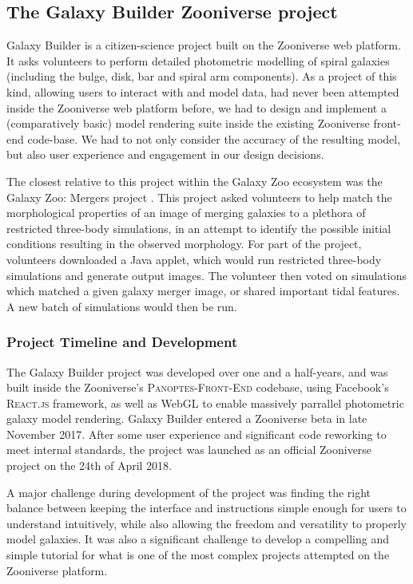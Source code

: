 \documentclass[../main.tex]{subfiles}
\begin{document}
\subsection{The Galaxy Builder Zooniverse project}

Galaxy Builder is a citizen-science project built on the Zooniverse web platform. It asks volunteers to perform detailed photometric modelling of spiral galaxies (including the bulge, disk, bar and spiral arm components). As a project of this kind, allowing users to interact with and model data, had never been attempted inside the Zooniverse web platform before, we had to design and implement a (comparatively basic) model rendering suite inside the existing Zooniverse front-end code-base. We had to not only consider the accuracy of the resulting model, but also user experience and engagement in our design decisions.

The closest relative to this project within the Galaxy Zoo ecosystem was the Galaxy Zoo: Mergers project \citep{Holincheck2016:1604.00435v1}. This project asked volunteers to help match the morphological properties of an image of merging galaxies to a plethora of restricted three-body simulations, in an attempt to identify the possible initial conditions resulting in the observed morphology. For part of the project, volunteers downloaded a Java applet, which would run restricted three-body simulations and generate output images. The volunteer then voted on simulations which matched a given galaxy merger image, or shared important tidal features. A new batch of simulations would then be run.

\subsubsection{Project Timeline and Development}

The Galaxy Builder project was developed over one and a half-years, and was built inside the Zooniverse's \textsc{Panoptes-Front-End} codebase, using Facebook's \textsc{React.js} framework, as well as WebGL to enable massively parrallel photometric galaxy model rendering. Galaxy Builder entered a Zooniverse beta in late November 2017. After some user experience and significant code reworking to meet internal standards, the project was launched as an official Zooniverse project on the 24th of April 2018.

A major challenge during development of the project was finding the right balance between keeping the interface and instructions simple enough for users to understand intuitively, while also allowing the freedom and versatility to properly model galaxies. It was also a significant challenge to develop a compelling and simple tutorial for what is one of the most complex projects attempted on the Zooniverse platform.
\end{document}
